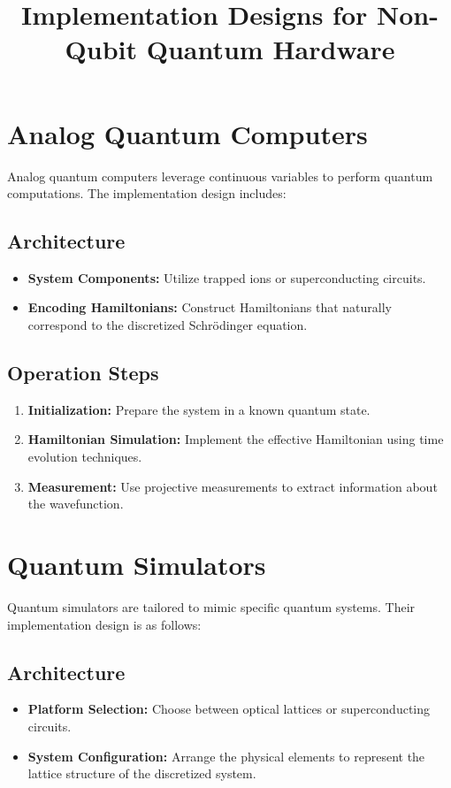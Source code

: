 \documentclass{article}
\title{Implementation Designs for Non-Qubit Quantum Hardware}
\author{}
\date{}
\begin{document}
\maketitle

\section{Analog Quantum Computers}

Analog quantum computers leverage continuous variables to perform quantum computations. The implementation design includes:

\subsection{Architecture}
\begin{itemize}
    \item \textbf{System Components:} Utilize trapped ions or superconducting circuits.
    \item \textbf{Encoding Hamiltonians:} Construct Hamiltonians that naturally correspond to the discretized Schrödinger equation.
\end{itemize}

\subsection{Operation Steps}
\begin{enumerate}
    \item \textbf{Initialization:} Prepare the system in a known quantum state.
    \item \textbf{Hamiltonian Simulation:} Implement the effective Hamiltonian using time evolution techniques.
    \item \textbf{Measurement:} Use projective measurements to extract information about the wavefunction.
\end{enumerate}

\section{Quantum Simulators}

Quantum simulators are tailored to mimic specific quantum systems. Their implementation design is as follows:

\subsection{Architecture}
\begin{itemize}
    \item \textbf{Platform Selection:} Choose between optical lattices or superconducting circuits.
    \item \textbf{System Configuration:} Arrange the physical elements to represent the lattice structure of the discretized system.
\end{itemize}
\end{document}
